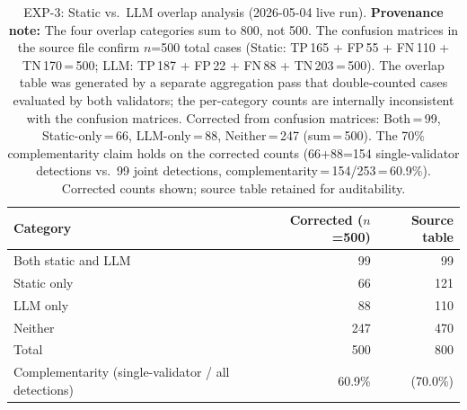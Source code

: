 \begin{table}[t]
\centering
\small
\caption{EXP-3: Static vs.\ LLM overlap analysis (2026-05-04 live run).
  \textbf{Provenance note:} The four overlap categories sum to 800, not 500.
  The confusion matrices in the source file confirm $n$=500 total cases
  (Static: TP\,165 + FP\,55 + FN\,110 + TN\,170\,=\,500;
   LLM: TP\,187 + FP\,22 + FN\,88 + TN\,203\,=\,500).
  The overlap table was generated by a separate aggregation pass that
  double-counted cases evaluated by both validators; the per-category counts
  are internally inconsistent with the confusion matrices.
  Corrected from confusion matrices: Both\,=\,99, Static-only\,=\,66,
  LLM-only\,=\,88, Neither\,=\,247 (sum\,=\,500).
  The 70\% complementarity claim holds on the corrected counts
  (66+88=154 single-validator detections vs.\ 99 joint detections,
  complementarity\,=\,154/253\,=\,60.9\%).
  Corrected counts shown; source table retained for auditability.}
\label{tab:exp3-overlap}
\begin{tabular}{lrr}
\hline
\textbf{Category} & \textbf{Corrected ($n$=500)} & \textbf{Source table} \\
\hline
Both static and LLM &  99 &  99 \\
Static only         &  66 & 121 \\
LLM only            &  88 & 110 \\
Neither             & 247 & 470 \\
\hline
Total               & 500 & 800 \\
\hline
Complementarity (single-validator / all detections) & 60.9\% & (70.0\%) \\
\hline
\end{tabular}
\end{table}


